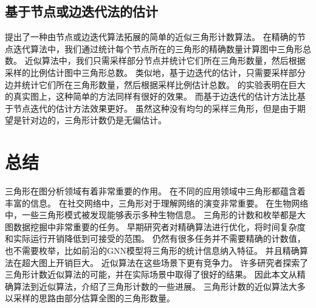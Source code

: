 \section{基于节点或边迭代法的估计}
\cite{rahman2013approximate}提出了一种由节点或边迭代算法拓展的简单的近似三角形计数算法。
在精确的节点迭代算法中，我们通过统计每个节点所在的三角形的精确数量计算图中三角形总数。
近似算法中，我们只需采样部分节点并统计它们所在三角形数量，然后根据采样的比例估计图中三角形总数。
类似地，基于边迭代的估计，只需要采样部分边并统计它们所在三角形数量，然后根据采样比例估计总数。
\cite{rahman2013approximate}的实验表明在巨大的真实图上，这种简单的方法同样有很好的效果。
而基于边迭代的估计方法比基于节点迭代的估计方法效果更好。
虽然这种没有均匀的采样三角形，但是由于期望是针对边的，三角形计数仍是无偏估计。

\chapter{总结}
三角形在图分析领域有着非常重要的作用。
在不同的应用领域中三角形都蕴含着丰富的信息。
在社交网络中，三角形对于理解网络的演变非常重要。
在生物网络中，一些三角形模式被发现能够表示多种生物信息。
三角形的计数和枚举都是大图数据挖掘中非常重要的任务。
早期研究者对精确算法进行优化，将时间复杂度和实际运行开销降低到可接受的范围。
仍然有很多任务并不需要精确的计数值，也不需要枚举，比如前沿的GNN模型将三角形的统计信息纳入特征。
并且精确算法在超大图上开销巨大。
近似算法在这些场景下更有竞争力。
许多研究者探索了三角形计数近似算法的可能，并在实际场景中取得了很好的结果。
因此本文从精确算法到近似算法，介绍了三角形计数的一些进展。
三角形计数的近似算法大多以采样的思路由部分估算全图的三角形数量。

